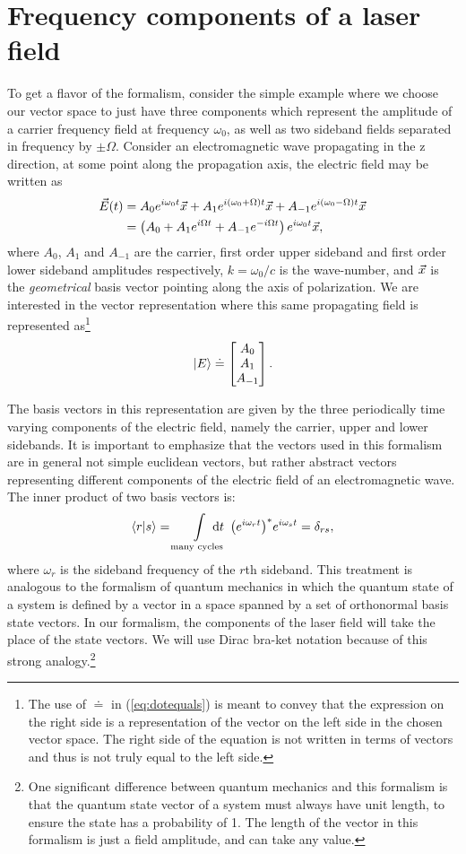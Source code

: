 \section{Frequency components of a laser field}
\label{sec:freqspace}
To get a flavor of the formalism, consider the simple example where we choose our vector space to just have three components which represent the amplitude of a carrier frequency field at frequency $\omega_0$, as well as two sideband fields separated in frequency by $\pm\Omega$. %
Consider an electromagnetic wave propagating in the z direction, at some point along the propagation axis, the electric field may be written as
\begin{align*}
\vec{E}(t) &= A_0 e^{i\omega_0t}\vec{x} + A_1e^{i(\omega_0+\Omega)t}\vec{x} + A_{-1}e^{i(\omega_0-\Omega)t}\vec{x}\\
&= \left( A_0 + A_1 e^{i\Omega t}+A_{-1}e^{-i\Omega t}\right) e^{i\omega_0 t}\vec{x},
\end{align*}
where $A_0$, $A_1$ and $A_{-1}$ are the carrier, first order upper sideband and first order lower sideband amplitudes respectively, $k=\omega_0/c$ is the wave-number, and $\vec{x}$ is the \emph{geometrical} basis vector pointing along the axis of polarization. %
We are interested in the vector representation where this same propagating field is represented as\footnote{The use of $\doteq$ in (\ref{eq:dotequals}) is meant to convey that the expression on the right side is a representation of the vector on the left side in the chosen vector space. %
The right side of the equation is not written in terms of vectors and thus is not truly equal to the left side.} 
\begin{equation}
\label{eq:dotequals}
\left| E \right> \doteq \left[\begin{matrix} A_0 \\ A_1 \\ A_{-1} \end{matrix}\right].
\end{equation}

The basis vectors in this representation are given by the three periodically time varying components of the electric field, namely the carrier, upper and lower sidebands. %
It is important to emphasize that the vectors used in this formalism are in general not simple euclidean vectors, but rather abstract vectors representing different components of the electric field of an electromagnetic wave. %
The inner product of two basis vectors is:
\[
\inprod{r}{s} = \int\limits_{\text{many cycles}}\! \! \! \! \! \! \! \! \!
\dd t \; \: {\left( e^{i\omega_{r}t}\right)^*}e^{i\omega_{s}t} = \delta_{rs},
\]
where $\omega_r$ is the sideband frequency of the $r$th sideband. %
This treatment is analogous to the formalism of quantum mechanics in which the quantum state of a system is defined by a vector in a space spanned by a set of orthonormal basis state vectors. %
In our formalism, the components of the laser field will take the place of the state vectors. %
We will use Dirac bra-ket notation because of this strong analogy.\footnote{One significant difference between quantum mechanics and this formalism is that the quantum state vector of a system must always have unit length, to ensure the state has a probability of 1. %
The length of the vector in this formalism is just a field amplitude, and can take any value.}

